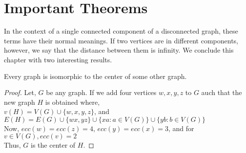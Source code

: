 \documentclass[../basic_graph_theory.tex]{subfiles}
\begin{document}
\section{Important Theorems}
In the context of a single connected component of a disconnected graph, these terms have their normal meanings. If two vertices are in different components, however, we say that the distance between them is infinity. We conclude this chapter with two interesting results.

\begin{Thm}{}{}
    Every graph is isomorphic to the center of some other graph.
\end{Thm}{}{}
\begin{proof}
    Let, $G$ be any graph. If we add four vertices $w,x,y,z$ to $G$ auch that the new graph $H$ is obtained where,\\
    $v(H)=V(G) \cup \{w,x,y,z\}$, and\\
    $E(H)=E(G) \cup \{wx,yz\} \cup \{xa:a \in V(G)\} \cup \{yb:b \in V(G)\}$\\
    Now, $ecc(w)=ecc(z)=4$, $ecc(y)=ecc(x)=3$, and for $v \in V(G), ecc(v)=2$\\
    Thus, $G$ is the center of $H$.
\end{proof}
\end{document}
